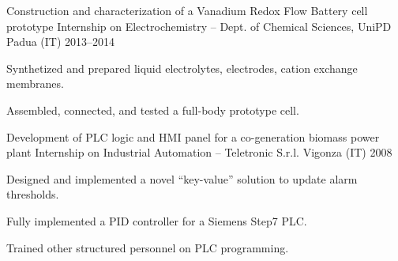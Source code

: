 \begin{cventries}
    \cventry%
        {Construction and characterization of a Vanadium Redox Flow Battery cell prototype}
        {Internship on Electrochemistry -- Dept. of Chemical Sciences, UniPD}
        {Padua (IT)}
        {2013--2014}
        {\begin{cvitems}
            \item Synthetized and prepared liquid electrolytes, electrodes, cation exchange membranes.
            \item Assembled, connected, and tested a full-body prototype cell.
        \end{cvitems}}

    \cventry%
        {Development of PLC logic and HMI panel for a co-generation biomass power plant}
        {Internship on Industrial Automation -- Teletronic S.r.l.}
        {Vigonza (IT)}
        {2008}
        {\begin{cvitems}
            \item Designed and implemented a novel ``key-value'' solution to update alarm thresholds.
            \item Fully implemented a PID controller for a Siemens Step7 PLC.
            \item Trained other structured personnel on PLC programming.
        \end{cvitems}}

\end{cventries}
